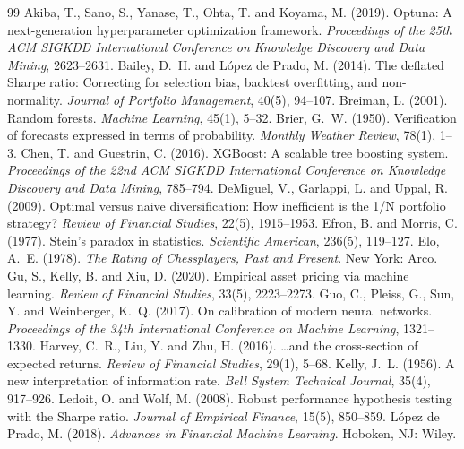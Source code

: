 \documentclass[11pt,a4paper]{article}
\begin{document}
\begin{thebibliography}{99}
 Akiba, T., Sano, S., Yanase, T., Ohta, T. and Koyama, M. (2019). Optuna: A next-generation hyperparameter optimization framework. \emph{Proceedings of the 25th ACM SIGKDD International Conference on Knowledge Discovery and Data Mining}, 2623--2631.
 Bailey, D.~H. and L\'opez de Prado, M. (2014). The deflated Sharpe ratio: Correcting for selection bias, backtest overfitting, and non-normality. \emph{Journal of Portfolio Management}, 40(5), 94--107.
 Breiman, L. (2001). Random forests. \emph{Machine Learning}, 45(1), 5--32.
 Brier, G.~W. (1950). Verification of forecasts expressed in terms of probability. \emph{Monthly Weather Review}, 78(1), 1--3.
 Chen, T. and Guestrin, C. (2016). XGBoost: A scalable tree boosting system. \emph{Proceedings of the 22nd ACM SIGKDD International Conference on Knowledge Discovery and Data Mining}, 785--794.
 DeMiguel, V., Garlappi, L. and Uppal, R. (2009). Optimal versus naive diversification: How inefficient is the 1/N portfolio strategy? \emph{Review of Financial Studies}, 22(5), 1915--1953.
 Efron, B. and Morris, C. (1977). Stein's paradox in statistics. \emph{Scientific American}, 236(5), 119--127.
 Elo, A.~E. (1978). \emph{The Rating of Chessplayers, Past and Present}. New York: Arco.
 Gu, S., Kelly, B. and Xiu, D. (2020). Empirical asset pricing via machine learning. \emph{Review of Financial Studies}, 33(5), 2223--2273.
 Guo, C., Pleiss, G., Sun, Y. and Weinberger, K.~Q. (2017). On calibration of modern neural networks. \emph{Proceedings of the 34th International Conference on Machine Learning}, 1321--1330.
 Harvey, C.~R., Liu, Y. and Zhu, H. (2016). \ldots and the cross-section of expected returns. \emph{Review of Financial Studies}, 29(1), 5--68.
 Kelly, J.~L. (1956). A new interpretation of information rate. \emph{Bell System Technical Journal}, 35(4), 917--926.
 Ledoit, O. and Wolf, M. (2008). Robust performance hypothesis testing with the Sharpe ratio. \emph{Journal of Empirical Finance}, 15(5), 850--859.
 L\'opez de Prado, M. (2018). \emph{Advances in Financial Machine Learning}. Hoboken, NJ: Wiley.

\end{thebibliography}
\end{document}
